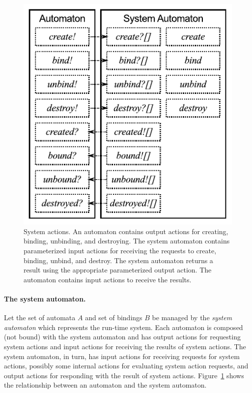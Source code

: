 
\begin{figure}
\center
\includegraphics[width=\textwidth]{system_action}
\caption{System actions.
  An automaton contains output actions for creating, binding, unbinding, and destroying.
  The system automaton contains parameterized input actions for receiving the requests to create, binding, unbind, and destroy.
  The system automaton returns a result using the appropriate parameterized output action.
  The automaton contains input actions to receive the results.}
\label{system_action}
\end{figure}

\paragraph{The system automaton.}
Let the set of automata $A$ and set of bindings $B$ be managed by the \emph{system automaton} which represents the run-time system.
Each automaton is composed (not bound) with the system automaton and has output actions for requesting system actions and input actions for receiving the results of system actions.
The system automaton, in turn, has input actions for receiving requests for system actions, possibly some internal actions for evaluating system action requests, and output actions for responding with the result of system actions.
Figure~\ref{system_action} shows the relationship between an automaton and the system automaton.

